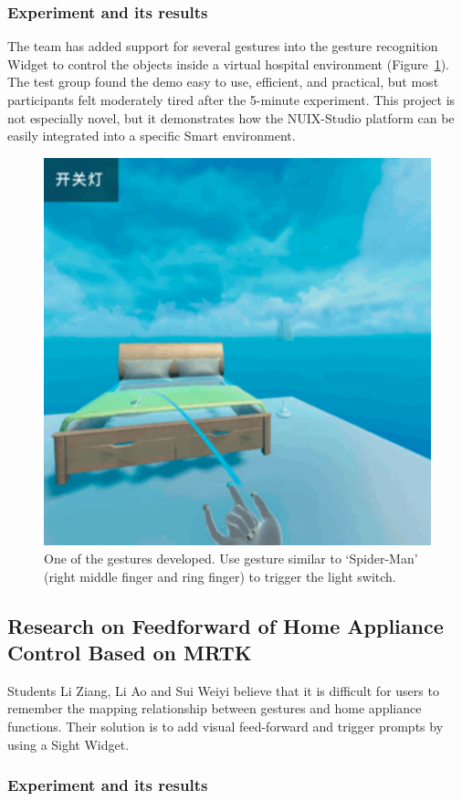 \subsubsection{Experiment and its results}

The team has added support for several gestures into the gesture recognition Widget to control the objects inside a virtual hospital environment (Figure~\ref{fig:Project4-figure}). The test group found the demo easy to use, efficient, and practical, but most participants felt moderately tired after the 5-minute experiment. This project is not especially novel, but it demonstrates how the NUIX-Studio platform can be easily integrated into a specific Smart environment.

\begin{figure}
  \centering
  \includegraphics[width=0.6\linewidth]{figures/Project_4.png}
  \caption{One of the gestures developed. Use gesture similar to ‘Spider-Man’ (right middle finger and ring finger) to trigger the light switch.}
  \label{fig:Project4-figure}
\end{figure}

\subsection{Research on Feedforward of Home Appliance Control Based on MRTK}

Students Li Ziang, Li Ao and Sui Weiyi believe that it is difficult for users to remember the mapping relationship between gestures and home appliance functions. Their solution is to add visual feed-forward and trigger prompts by using a Sight Widget.

\subsubsection{Experiment and its results}

